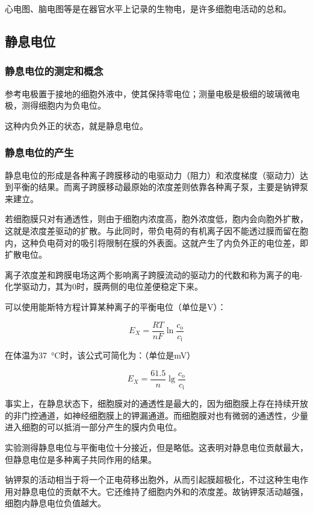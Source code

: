 心电图、脑电图等是在器官水平上记录的生物电，是许多细胞电活动的总和。

\subsection{静息电位}

\subsubsection{静息电位的测定和概念}

参考电极置于接地的细胞外液中，使其保持零电位；测量电极是极细的玻璃微电极，测得细胞内为负电位。

这种内负外正的状态，就是静息电位。

\subsubsection{静息电位的产生}

静息电位的形成是各种离子跨膜移动的电驱动力（阻力）和浓度梯度（驱动力）达到平衡的结果。而离子跨膜移动最原始的浓度差则依靠各种离子泵，主要是钠钾泵来建立。

若细胞膜只对有通透性，则由于细胞内浓度高，胞外浓度低，胞内会向胞外扩散，这就是浓度差驱动的扩散。与此同时，带负电荷的有机离子因不能透过膜而留在胞内，这种负电荷对的吸引将限制在膜的外表面。这就产生了内负外正的电位差，即扩散电位。

离子浓度差和跨膜电场这两个影响离子跨膜流动的驱动力的代数和称为离子的电-化学驱动力，其为0时，膜两侧的电位差便稳定下来。

可以使用能斯特方程计算某种离子的平衡电位（单位是\si{\V}）：

\[E_X = \frac{RT}{nF} \ln \frac{c_\text{o}}{c_\text{i}}\]

在体温为\SI{37}{\degreeCelsius}时，该公式可简化为：（单位是\si{\mV}）

\[E_X = \frac{61.5}{n} \lg \frac{c_\text{o}}{c_\text{i}}\]

事实上，在静息状态下，细胞膜对的通透性是最大的，因为细胞膜上存在持续开放的非门控通道，如神经细胞膜上的钾漏通道。而细胞膜对也有微弱的通透性，少量进入细胞的可以抵消一部分产生的膜内负电位。

实验测得静息电位与平衡电位十分接近，但是略低。这表明对静息电位贡献最大，但静息电位是多种离子共同作用的结果。

钠钾泵的活动相当于将一个正电荷移出胞外，从而引起膜超极化，不过这种生电作用对静息电位的贡献不大。它还维持了细胞内外和的浓度差。故钠钾泵活动越强，细胞内静息电位负值越大。

